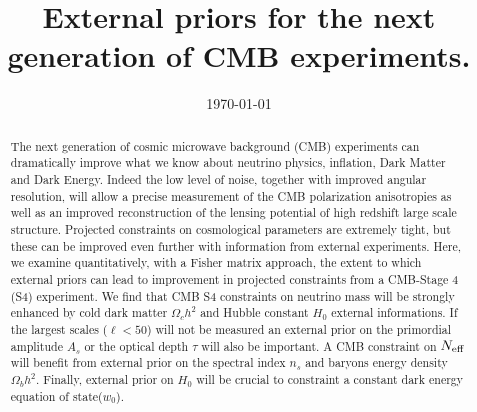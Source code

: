 \documentclass[aps,prd,reprint,superscriptaddress]{revtex4-1}
\begin{document}
\graphicspath{{images/}}

\title{External priors for the next generation of CMB experiments.}
%
%

%



\date{\today}
\begin{abstract}
The next generation of cosmic microwave background (CMB) experiments can dramatically improve what we know about neutrino physics, inflation, Dark Matter and Dark Energy. 
Indeed the low level of noise, together with improved angular resolution, will allow a precise measurement of the CMB polarization anisotropies as well as an improved reconstruction of the lensing potential of high redshift large scale structure. 
Projected constraints on cosmological parameters are extremely tight, but these can be improved even further with information from external experiments. Here, we examine quantitatively, with a Fisher matrix approach, the extent to which external priors can lead to improvement in projected constraints from a CMB-Stage 4 (S4) experiment.
We find that CMB S4 constraints on neutrino mass will be strongly enhanced by cold dark matter $\Omega_{c}h^{2}$ and Hubble constant $H_{0}$ external informations. If the largest scales ($\ell<50$) will not be measured an external prior on the primordial amplitude $A_{s}$ or the optical depth $\tau$ will also be important. A CMB constraint on $N_{\rm eff}$ will benefit from external prior on the spectral index $n_{s}$ and baryons energy density $\Omega_{b}h^{2}$. Finally, external prior on $H_{0}$ will be crucial to constraint a constant dark energy equation of state($w_{0}$).
\end{abstract}
\end{document}
